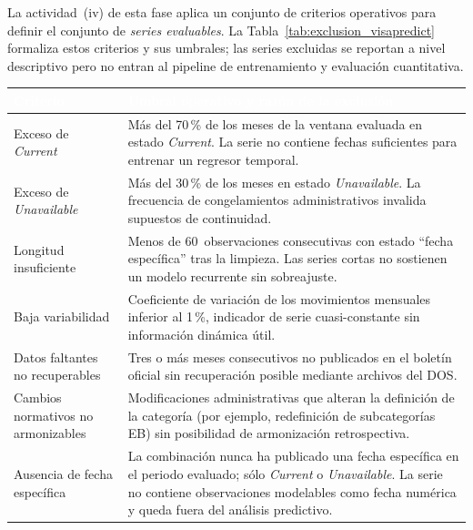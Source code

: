 \documentclass[12pt,letterpaper]{report}
\begin{document}
La actividad~(iv) de esta fase aplica un conjunto de criterios operativos para definir el conjunto de \textit{series evaluables}. La Tabla~\ref{tab:exclusion_visapredict} formaliza estos criterios y sus umbrales; las series excluidas se reportan a nivel descriptivo pero no entran al pipeline de entrenamiento y evaluación cuantitativa.

\begin{table}[H]
    \centering
    \footnotesize
    \setlength{\arrayrulewidth}{0.7pt}
    \setlength{\tabcolsep}{4pt}
    \begin{tabular}{>{\raggedright\arraybackslash}p{4.0cm}
                    >{\raggedright\arraybackslash}p{8.6cm}}
        \hline
        \rowcolor{uacjblue!85}
        \textcolor{white}{\textbf{Criterio}} &
        \textcolor{white}{\textbf{Umbral operativo y razón de la exclusión}} \\
        \hline
        \rowcolor{uacjblue!4}
        Exceso de \textit{Current} & Más del 70\,\% de los meses de la ventana evaluada en estado \textit{Current}. La serie no contiene fechas suficientes para entrenar un regresor temporal. \\
        Exceso de \textit{Unavailable} & Más del 30\,\% de los meses en estado \textit{Unavailable}. La frecuencia de congelamientos administrativos invalida supuestos de continuidad. \\
        \rowcolor{uacjblue!4}
        Longitud insuficiente & Menos de 60~observaciones consecutivas con estado ``fecha específica'' tras la limpieza. Las series cortas no sostienen un modelo recurrente sin sobreajuste. \\
        Baja variabilidad & Coeficiente de variación de los movimientos mensuales inferior al 1\,\%, indicador de serie cuasi-constante sin información dinámica útil. \\
        \rowcolor{uacjblue!4}
        Datos faltantes no recuperables & Tres o más meses consecutivos no publicados en el boletín oficial sin recuperación posible mediante archivos del DOS. \\
        Cambios normativos no armonizables & Modificaciones administrativas que alteran la definición de la categoría (por ejemplo, redefinición de subcategorías EB) sin posibilidad de armonización retrospectiva. \\
        \rowcolor{uacjblue!4}
        Ausencia de fecha específica & La combinación nunca ha publicado una fecha específica en el periodo evaluado; sólo \textit{Current} o \textit{Unavailable}. La serie no contiene observaciones modelables como fecha numérica y queda fuera del análisis predictivo. \\

\end{tabular}
\end{table}
\end{document}
